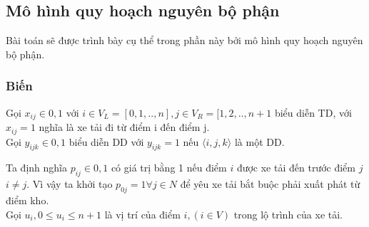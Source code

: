 \documentclass[a4paper,12pt]{report}
\begin{document}
\subsection{Mô hình quy hoạch nguyên bộ phận}
Bài toán sẽ được trình bày cụ thể trong phần này bởi mô hình quy hoạch nguyên bộ phận.
\subsubsection{Biến}
Gọi $x_{ij} \in {0,1}$ với $i \in V_L= [0,1,..,n], j \in V_R= [1,2,..,n+1$ biểu diễn \ac{TD}, với $x_{ij}=1$ nghĩa là xe tải đi từ điểm i đến điểm j.\\

Gọi $y_{ijk} \in {0,1}$ biểu diễn \ac{DD} với $y_{ijk}=1$ nếu $\langle i,j,k \rangle$ là một \ac{DD}.

Ta định nghĩa $p_{ij} \in {0,1}$ có giá trị bằng 1 nếu điểm $i$ được xe tải đến trước điểm $j$ $i \neq j$. Vì vậy ta khởi tạo $p_{0j}=1 \forall j \in N$ để yêu xe tải bắt buộc phải xuất phát từ điểm kho. \\

Gọi $u_i, 0\leq u_i \leq n+1$ là vị trí của điểm $i, (i \in V)$ trong lộ trình của xe tải.
\end{document}

